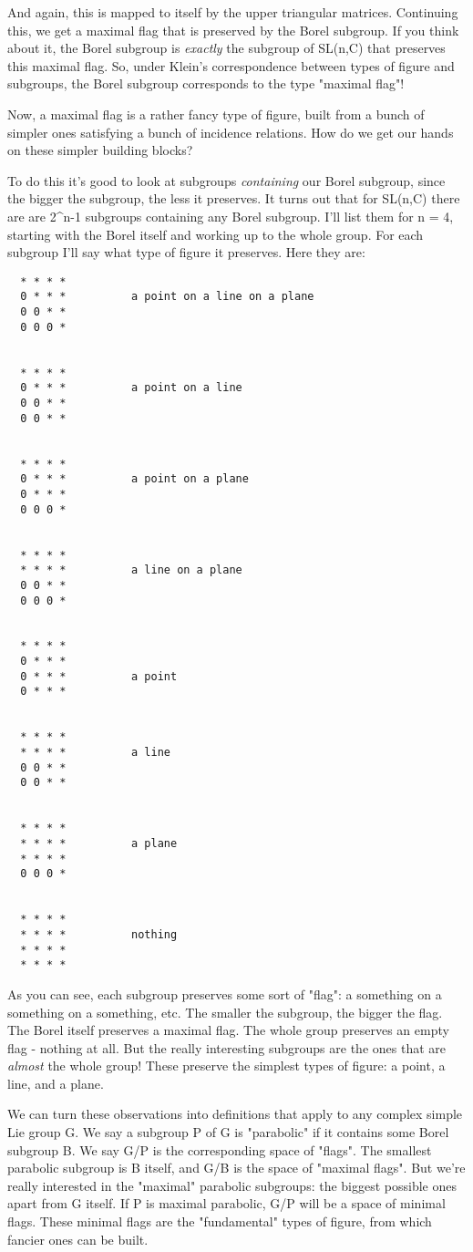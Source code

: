 And again, this is mapped to itself by the upper triangular matrices.
Continuing this, we get a maximal flag that is preserved by the
Borel subgroup.  If you think about it, the Borel subgroup is
\emph{exactly} the subgroup of SL(n,C) that preserves this maximal flag.    
So, under Klein's correspondence between types of figure and subgroups,
the Borel subgroup corresponds to the type "maximal flag"!

Now, a maximal flag is a rather fancy type of figure, built from a bunch
of simpler ones satisfying a bunch of incidence relations.  How do we
get our hands on these simpler building blocks?

To do this it's good to look at subgroups \emph{containing} our Borel
subgroup, since the bigger the subgroup, the less it preserves.  It
turns out that for SL(n,C) there are are 2^{n-1} subgroups containing
any Borel subgroup.  I'll list them for n = 4, starting with the Borel
itself and working up to the whole group.  For each subgroup I'll say
what type of figure it preserves.  Here they are:


\begin{verbatim}
  * * * *
  0 * * *          a point on a line on a plane    
  0 0 * *
  0 0 0 *


  * * * *
  0 * * *          a point on a line
  0 0 * *
  0 0 * *


  * * * *
  0 * * *          a point on a plane
  0 * * *
  0 0 0 *


  * * * *
  * * * *          a line on a plane
  0 0 * *
  0 0 0 *


  * * * *
  0 * * *                            
  0 * * *          a point
  0 * * *


  * * * *
  * * * *          a line
  0 0 * *
  0 0 * *


  * * * *
  * * * *          a plane
  * * * *
  0 0 0 *


  * * * *
  * * * *          nothing
  * * * *
  * * * *
\end{verbatim}
    

As you can see, each subgroup preserves some sort of "flag": a
something on a something on a something, etc.  The smaller the subgroup,
the bigger the flag.  The Borel itself preserves a maximal flag.  The
whole group preserves an empty flag - nothing at all.  But the really
interesting subgroups are the ones that are \emph{almost} the whole group!
These preserve the simplest types of figure: a point, a line, and a
plane.

We can turn these observations into definitions that apply to any
complex simple Lie group G.  We say a subgroup P of G is
"parabolic" if it contains some Borel subgroup B.  We say G/P
is the corresponding space of "flags".  The smallest parabolic
subgroup is B itself, and G/B is the space of "maximal flags".
But we're really interested in the "maximal" parabolic
subgroups: the biggest possible ones apart from G itself.  If P is
maximal parabolic, G/P will be a space of minimal flags.  These minimal
flags are the "fundamental" types of figure, from which
fancier ones can be built.

